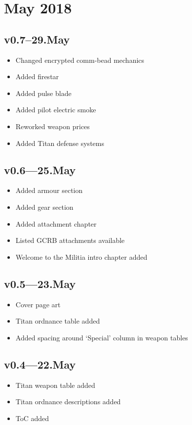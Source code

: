 \documentclass[9pt, openany]{extbook}
\begin{document}
{\small

\section{May 2018}

\subsection{v0.7--29.May}
\begin{itemize}[noitemsep]
\item Changed encrypted comm-bead mechanics
\item Added firestar
\item Added pulse blade
\item Added pilot electric smoke
\item Reworked weapon prices
\item Added Titan defense systems
\end{itemize}



\subsection{v0.6---25.May}
\begin{itemize}[noitemsep]
\item Added armour section
\item Added gear section
\item Added attachment chapter
\item Listed GCRB attachments available
\item Welcome to the Militia intro chapter added
\end{itemize}

\subsection{v0.5---23.May}
\begin{itemize}[noitemsep]
\item Cover page art
\item Titan ordnance table added
\item Added spacing around `Special' column in weapon tables
\end{itemize}

\subsection{v0.4---22.May}
\begin{itemize}[noitemsep]
\item Titan weapon table added
\item Titan ordnance descriptions added
\item ToC added
\end{itemize}


}
\end{document}
